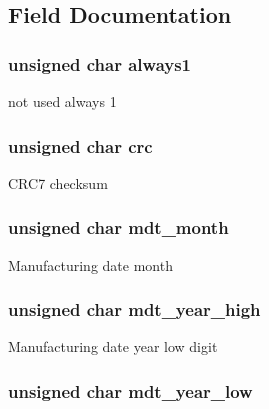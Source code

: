 \subsection{Field Documentation}
\hypertarget{struct_c_i_d_af3bbe76c61e108c500f5a861dff1e6c2}{
\subsubsection[{always1}]{\setlength{\rightskip}{0pt plus 5cm}unsigned char always1}}\label{struct_c_i_d_af3bbe76c61e108c500f5a861dff1e6c2}
not used always 1 \hypertarget{struct_c_i_d_aa7963a1d695d609cf3609747cf19fd71}{
\subsubsection[{crc}]{\setlength{\rightskip}{0pt plus 5cm}unsigned char crc}}\label{struct_c_i_d_aa7963a1d695d609cf3609747cf19fd71}
C\-R\-C7 checksum \hypertarget{struct_c_i_d_a6f31f0414d7c277a8f3ac4a8e7a83101}{
\subsubsection[{mdt\-\_\-month}]{\setlength{\rightskip}{0pt plus 5cm}unsigned char mdt\-\_\-month}}\label{struct_c_i_d_a6f31f0414d7c277a8f3ac4a8e7a83101}
Manufacturing date month \hypertarget{struct_c_i_d_a5e4772a445bb5e242f62d89ed9fa01bb}{
\subsubsection[{mdt\-\_\-year\-\_\-high}]{\setlength{\rightskip}{0pt plus 5cm}unsigned char mdt\-\_\-year\-\_\-high}}\label{struct_c_i_d_a5e4772a445bb5e242f62d89ed9fa01bb}
Manufacturing date year low digit \hypertarget{struct_c_i_d_aaf6f6e0f7e73844d7d2a59b3e7f3b6de}{
\subsubsection[{mdt\-\_\-year\-\_\-low}]{\setlength{\rightskip}{0pt plus 5cm}unsigned char mdt\-\_\-year\-\_\-low}}\label{struct_c_i_d_aaf6f6e0f7e73844d7d2a59b3e7f3b6de}
